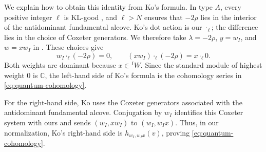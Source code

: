 \documentclass[11pt,a4paper,reqno]{amsart}
\numberwithin{equation}{section}
\theoremstyle{definition}
\theoremstyle{remark}
\theoremstyle{plain}
\begin{document}
We explain how to obtain this identity from Ko's formula.
In type $A$, every positive integer $\ell$ is KL-good
\cite[\S2.2]{Ko2019}, and $\ell>N$ ensures that $-2\rho$
lies in the interior of the antidominant fundamental alcove. Ko's dot action is our $\cdot_\ell$; the difference lies
in the choice of Coxeter generators. 
We therefore take $\lambda=-2\rho$, $y=w_I$, and $w=xw_I$
in \cite[(2.3.1)]{Ko2019}. These choices give
\[
w_I\cdot_\ell(-2\rho)=0,
\qquad
(xw_I)\cdot_\ell(-2\rho)=x\cdot_\ell0.
\]
Both weights are dominant because $x\in{}^IW$.
Since the standard module of highest weight $0$ is $\mathbb C$,
the left-hand side of Ko's formula is the cohomology series
in \eqref{eq:quantum-cohomology}.

For the right-hand side, Ko uses the Coxeter generators
associated with the antidominant fundamental alcove.
Conjugation by $w_I$ identifies this Coxeter system with
ours and sends $(w_I,xw_I)$ to $(w_I,w_Ix)$.
Thus, in our normalization, Ko's right-hand side is
$h_{w_I,w_Ix}(v)$, proving \eqref{eq:quantum-cohomology}.
\end{document}
